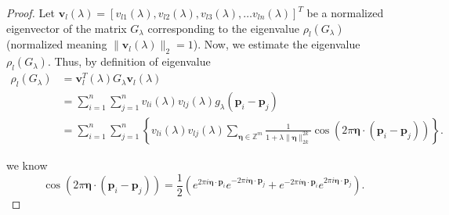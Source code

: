 \documentclass[10pt,a4paper]{amsart}
\begin{document}
\begin{proof}
Let $\boldsymbol{v}_l(\lambda) = [v_{l1}(\lambda),v_{l2}(\lambda),v_{l3}(\lambda),\ldots v_{ln}(\lambda)]^T$ be a normalized eigenvector of the matrix $G_{\lambda}$ corresponding to the eigenvalue $\rho_l(G_{\lambda})$ (normalized meaning $\|\boldsymbol{v}_l(\lambda)\|_2=1$). Now, we estimate the eigenvalue $\rho_l(G_{\lambda})$. Thus, by definition of eigenvalue 
\begin{equation}\label{eigest}
\begin{aligned}
    \rho_l(G_{\lambda}) &= \boldsymbol{v}_l^T(\lambda)G_{\lambda}\boldsymbol{v}_l(\lambda)\\
    &= \sum\limits_{i=1}^n\sum\limits_{j=1}^nv_{li}(\lambda)v_{lj}(\lambda)g_{\lambda}(\boldsymbol{p}_i-\boldsymbol{p}_j)\\
    &= \sum\limits_{i=1}^n\sum\limits_{j=1}^n\left\{v_{li}(\lambda)v_{lj}(\lambda)\sum_{\boldsymbol{\eta}\in\mathbb{Z}^m} \frac{1}{1+\lambda\|\boldsymbol{\eta}\|_{2k}^{2k}} \cos{(2\pi\boldsymbol{\eta}\cdot(\boldsymbol{p}_i-\boldsymbol{p}_j))}\right\}.
\end{aligned}
\end{equation} 

we know \begin{equation}\label{dmoiver}
    \cos{(2\pi\boldsymbol{\eta}\cdot(\boldsymbol{p}_i-\boldsymbol{p}_j))} = \frac{1}{2}\left(e^{2\pi i \boldsymbol{\eta}\cdot\boldsymbol{p}_i } e^{-2\pi i \boldsymbol{\eta}\cdot\boldsymbol{p}_j} + e^{-2\pi i \boldsymbol{\eta}\cdot\boldsymbol{p}_i } e^{2\pi i \boldsymbol{\eta}\cdot\boldsymbol{p}_j}\right). 
\end{equation}


\end{proof}
\end{document}
